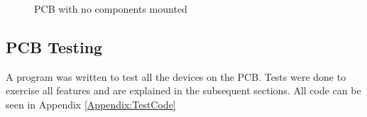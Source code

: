 \begin{figure}
\caption{PCB with no components mounted}
\label{fig:PCB:Bare}
\end{figure}

\subsection{PCB Testing}
A program was written to test all the devices on the PCB. Tests were done to exercise all features and are explained in the subsequent sections. All code can be seen in Appendix \ref{Appendix:TestCode}



